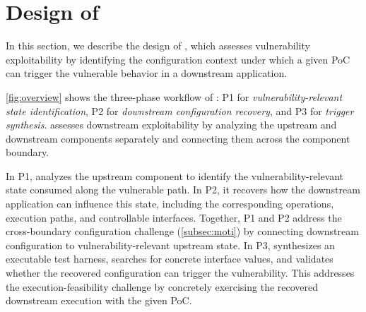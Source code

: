 \section{Design of \sys}

In this section, we describe the design of \sys, which assesses vulnerability exploitability by identifying the configuration context under which a given PoC can trigger the vulnerable behavior in a downstream application.

\autoref{fig:overview} shows the three-phase workflow of \sys: P1 for \textit{vulnerability-relevant state identification}, P2 for \textit{downstream configuration recovery}, and P3 for \textit{trigger synthesis}. \sys assesses downstream exploitability by analyzing the upstream and downstream components separately and connecting them across the component boundary. 








In P1, \sys analyzes the upstream component to identify the vulnerability-relevant state consumed along the vulnerable path. In P2, it recovers how the downstream application can influence this state, including the corresponding operations, execution paths, and controllable interfaces. Together, P1 and P2 address the cross-boundary configuration challenge (\autoref{subsec:moti}) by connecting downstream configuration to vulnerability-relevant upstream state.
%
In P3, \sys synthesizes an executable test harness, searches for concrete interface values, and validates whether the recovered configuration can trigger the vulnerability. This addresses the execution-feasibility challenge by concretely exercising the recovered
downstream execution with the given PoC.


